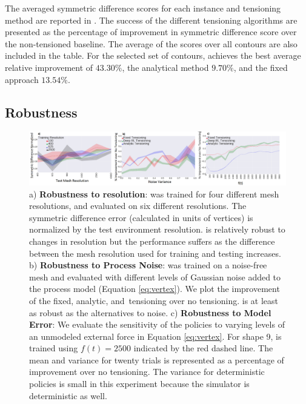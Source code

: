 The averaged symmetric difference scores for each instance  and tensioning method are reported in .  
The success of the different tensioning algorithms are presented as the percentage of improvement in symmetric difference score over the non-tensioned baseline. 
The average of the scores over all \numshapes contours are also included in the table.   
For the selected set of contours, \tpsalgo achieves the best average relative improvement of $43.30\%$, the analytical method $9.70\%$, and the fixed approach $13.54\%$.
\subsection*{Robustness}
\begin{figure}[t!]
\centering
 \includegraphics[width=\linewidth]{tps-experiments/tables3.png}
\caption{a) \textbf{Robustness to resolution}: \tpsalgo was  trained for four different mesh resolutions, and evaluated on six different resolutions. The symmetric difference error (calculated in units of vertices)  is normalized by the test environment resolution. \tpsalgo is relatively robust to changes in resolution but the performance suffers as the  difference between the mesh resolution  used for training and testing increases.
b) \textbf{Robustness to Process Noise}: \tpsalgo was trained on a noise-free mesh and evaluated with different levels of Gaussian noise added to the process model (Equation \eqref{eq:vertex}). We plot the improvement of the fixed, analytic, and \tpsalgo\,tensioning over  no tensioning. \tpsalgo is at least as robust as the alternatives to noise.
c) \textbf{Robustness to Model Error}: We evaluate the sensitivity of the policies to varying levels of an  unmodeled external force  in Equation \eqref{eq:vertex}. For shape 9, \tpsalgo is trained using $f(t)=2500$  indicated by the red dashed line. The mean and variance for twenty trials is represented as a percentage of improvement over no tensioning. The variance for deterministic policies is small in this experiment because the simulator is deterministic as well. } 
\vspace{-10pt}
\end{figure}

